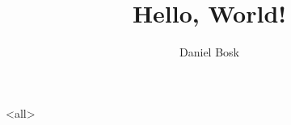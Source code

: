 \documentclass[ignoreframetext]{beamer}
\begin{document}
\title{%
  Hello, World!
}
\author{Daniel Bosk}

\begin{frame}
  \maketitle
\end{frame}

\mode<all>

\mode*
%
\end{document}
